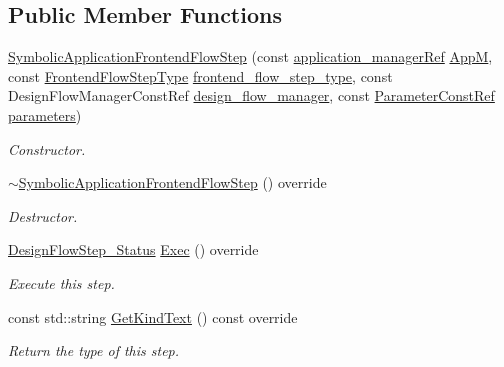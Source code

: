 \subsection*{Public Member Functions}
\begin{DoxyCompactItemize}
\item 
\hyperlink{classSymbolicApplicationFrontendFlowStep_a80ea7eea8b5aebb0c08e06a174a184fd}{Symbolic\+Application\+Frontend\+Flow\+Step} (const \hyperlink{application__manager_8hpp_a04ccad4e5ee401e8934306672082c180}{application\+\_\+manager\+Ref} \hyperlink{classFrontendFlowStep_a0ac0d8db2a378416583f51c4faa59d15}{AppM}, const \hyperlink{frontend__flow__step_8hpp_afeb3716c693d2b2e4ed3e6d04c3b63bb}{Frontend\+Flow\+Step\+Type} \hyperlink{classFrontendFlowStep_ad49067d6a17119d47316149ab757b60d}{frontend\+\_\+flow\+\_\+step\+\_\+type}, const Design\+Flow\+Manager\+Const\+Ref \hyperlink{classDesignFlowStep_ab770677ddf087613add30024e16a5554}{design\+\_\+flow\+\_\+manager}, const \hyperlink{Parameter_8hpp_a37841774a6fcb479b597fdf8955eb4ea}{Parameter\+Const\+Ref} \hyperlink{classDesignFlowStep_a802eaafe8013df706370679d1a436949}{parameters})
\begin{DoxyCompactList}\small\item\em Constructor. \end{DoxyCompactList}\item 
\hyperlink{classSymbolicApplicationFrontendFlowStep_af61a1ce5df749b66af0188bc604bce95}{$\sim$\+Symbolic\+Application\+Frontend\+Flow\+Step} () override
\begin{DoxyCompactList}\small\item\em Destructor. \end{DoxyCompactList}\item 
\hyperlink{design__flow__step_8hpp_afb1f0d73069c26076b8d31dbc8ebecdf}{Design\+Flow\+Step\+\_\+\+Status} \hyperlink{classSymbolicApplicationFrontendFlowStep_ad75eb18151a95dc374523c24ec78a1b5}{Exec} () override
\begin{DoxyCompactList}\small\item\em Execute this step. \end{DoxyCompactList}\item 
const std\+::string \hyperlink{classSymbolicApplicationFrontendFlowStep_a3fdc0f543227c3393142eba328137704}{Get\+Kind\+Text} () const override
\begin{DoxyCompactList}\small\item\em Return the type of this step. \end{DoxyCompactList}\item 

\end{DoxyCompactItemize}
